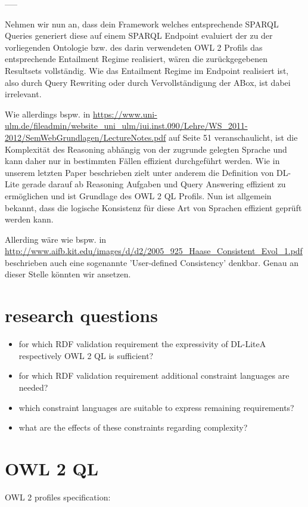 \documentclass{llncs}
\begin{document}
-----

Nehmen wir nun an, dass dein Framework welches entsprechende SPARQL Queries generiert diese auf einem SPARQL Endpoint evaluiert der zu der vorliegenden Ontologie bzw. des darin verwendeten OWL 2 Profils das entsprechende Entailment Regime realisiert, wären die zurückgegebenen Resultsets vollständig. Wie das Entailment Regime im Endpoint realisiert ist, also durch Query Rewriting oder durch Vervollständigung der ABox, ist dabei irrelevant.

Wie allerdings bspw. in 
\url{https://www.uni-ulm.de/fileadmin/website_uni_ulm/iui.inst.090/Lehre/WS_2011-2012/SemWebGrundlagen/LectureNotes.pdf}
auf Seite 51 veranschaulicht, ist die Komplexität des Reasoning abhängig von der zugrunde gelegten Sprache und kann daher nur in bestimmten Fällen effizient durchgeführt werden. Wie in unserem letzten Paper beschrieben zielt unter anderem die Definition von DL-Lite gerade darauf ab Reasoning Aufgaben und Query Answering effizient zu ermöglichen und ist Grundlage des OWL 2 QL Profils. Nun ist allgemein bekannt, dass die logische Konsistenz für diese Art von Sprachen effizient geprüft werden kann. 

Allerding wäre wie bspw. in 
\url{http://www.aifb.kit.edu/images/d/d2/2005_925_Haase_Consistent_Evol_1.pdf} beschrieben auch eine sogenannte 'User-defined Consistency' denkbar. Genau an dieser Stelle könnten wir ansetzen.

\section{research questions}

\begin{itemize}
	\item for which RDF validation requirement the expressivity of DL-LiteA respectively OWL 2 QL is sufficient?
	\item for which RDF validation requirement additional constraint languages are needed?
	\item which constraint languages are suitable to express remaining requirements?
	\item what are the effects of these constraints regarding complexity?
\end{itemize}

\section{OWL 2 QL}

OWL 2 profiles specification: \cite{owl2profiles2008}
\end{document}
